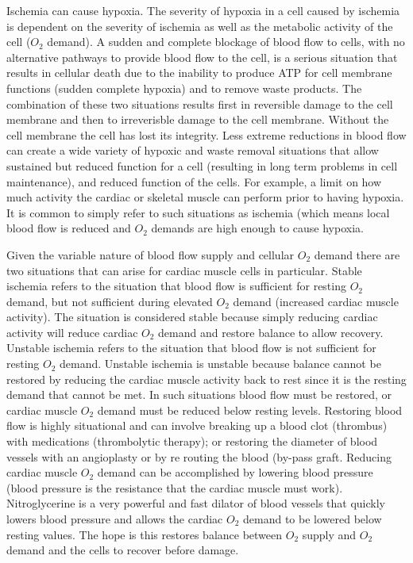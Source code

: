 Ischemia can cause hypoxia. The severity of hypoxia in a cell caused by ischemia is dependent on the severity of ischemia as well as the metabolic activity of the cell ($O_2$ demand). A sudden and complete blockage of blood flow to cells, with no alternative pathways to provide blood flow to the cell, is a serious situation that results in cellular death due to the inability to produce ATP for cell membrane functions (sudden complete hypoxia) and to remove waste products. The combination of these two situations results first in reversible damage to the cell membrane and then to irreverisble damage to the cell membrane. Without the cell membrane the cell has lost its integrity. Less extreme reductions in blood flow can create a wide variety of hypoxic and waste removal situations that allow sustained but reduced function for a cell (resulting in long term problems in cell maintenance), and reduced function of the cells. For example, a limit on how much activity the cardiac or skeletal muscle can perform prior to having hypoxia. It is common to simply refer to such situations as ischemia (which means local blood flow is reduced and $O_2$ demands are high enough to cause hypoxia. 

Given the variable nature of blood flow supply and cellular $O_2$ demand there are two situations that can arise for cardiac muscle cells in particular. Stable ischemia refers to the situation that blood flow is sufficient for resting $O_2$ demand, but not sufficient during elevated $O_2$ demand (increased cardiac muscle activity). The situation is considered stable because simply reducing cardiac activity will reduce cardiac $O_2$ demand and restore balance to allow recovery. Unstable ischemia refers to the situation that blood flow is not sufficient for resting $O_2$ demand. Unstable ischemia is unstable because balance cannot be restored by reducing the cardiac muscle activity back to rest since it is the resting demand that cannot be met. In such situations blood flow must be restored, or cardiac muscle $O_2$ demand must be reduced below resting levels. Restoring blood flow is highly situational and can involve breaking up a blood clot (thrombus) with medications (thrombolytic therapy); or restoring the diameter of blood vessels with an angioplasty or by re routing the blood (by-pass graft. Reducing cardiac muscle $O_2$ demand can be accomplished by lowering blood pressure (blood pressure is the resistance that the cardiac muscle must work). Nitroglycerine is a very powerful and fast dilator of blood vessels that quickly lowers blood pressure and allows the cardiac $O_2$ demand to be lowered below resting values. The hope is this restores balance between $O_2$ supply and $O_2$ demand and the cells to recover before damage.

